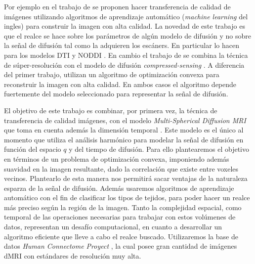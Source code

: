\documentclass[a4paper,10pt]{article}
\begin{document}
Por ejemplo en el trabajo de \citet{Alexander2014} se proponen hacer transferencia de 
calidad de imágenes utilizando algoritmos de aprendizaje automático 
(\textit{machine learning} del ingles) para construir la imagen con alta 
calidad. 
La novedad de este trabajo es que el realce se hace sobre los parámetros de algún modelo de difusión y no sobre la señal 
de difusión tal como la adquieren los escáners. En particular lo hacen para los modelos DTI y NODDI \citep{Zhang2012}. 
En cambio el trabajo de \citet{Ning2016} se combina la 
t\'ecnica de súper-resolución con el modelo de difusión \textit{compressed-sensing} \citep{Naidoo2015}. A 
diferencia del primer trabajo, utilizan un algoritmo de optimización convexa para reconstruir la imagen con alta 
calidad. En ambos casos el algoritmo depende fuertemente del modelo seleccionado para representar la señal de difusión.

El objetivo de este trabajo es combinar, por primera vez, la técnica de transferencia de calidad imágenes, con el 
modelo \textit{Multi-Spherical Diffusion MRI} que toma en cuenta además la dimensión temporal \citep{Fick}. Este modelo 
es el \'unico al momento que utiliza el análisis harmónico para modelar la señal de difusión en función del espacio $q$ 
y del tiempo de difusión. Para ello plantearemos el objetivo en términos de un problema de optimización convexa, 
imponiendo además suavidad en la imagen resultante, dado la correlaci\'on que existe entre voxeles vecinos. Plantearlo 
de esta manera nos permitirá sacar ventajas de la naturaleza esparza de la señal de difusión. Además usaremos 
algoritmos de aprendizaje automático con el fin de clasificar los tipos de tejidos, para poder hacer un realce más 
preciso según la región de la imagen. Tanto la complejidad espacial, como temporal de las operaciones necesarias para 
trabajar con estos vol\'umenes de datos, representan un desafío computacional, en cuanto a desarrollar un algoritmo 
eficiente que lleve a cabo el realce buscado. Utilizaremos la base de datos \textit{Human Connectome Proyect} 
\citep{Barch2013}, la cual posee gran cantidad de imágenes dMRI con estándares de resolución muy alta.


\clearpage


\end{document}
